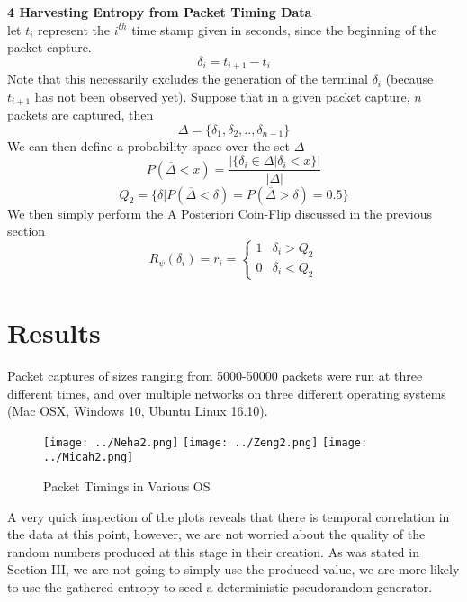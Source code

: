 \documentclass{IEEEtran}
\newenvironment{definition}[1][Definition]{\begin{trivlist}
\item[\hskip \labelsep {\bfseries #1}]}{\end{trivlist}}
\begin{document}
\begin{definition}
\textbf{4 Harvesting Entropy from Packet Timing Data} \\
let $t_i$ represent the $i^{th}$ time stamp given in seconds, since the beginning of the packet capture. 
$$\delta_i = t_{i+1} - t_{i}$$
Note that this necessarily excludes the generation of the terminal $\delta_i$ (because $t_{i+1}$ has not been observed yet). Suppose that in a given packet capture, $n$ packets are captured, then
$$\Delta = \{\delta_1,\delta_2,..,\delta_{n-1}\}$$
We can then define a probability space over the set $\Delta$
$$P(\overline{\Delta} < x) =  \frac{\vert\{\delta_i \in \Delta| \delta_i < x\}\vert}{\vert \Delta \vert}$$
$$Q_2 = \{\delta \vert P(\overline{\Delta} < \delta) = P(\overline{\Delta} > \delta) = 0.5\}$$
We then simply perform the A Posteriori Coin-Flip discussed in the previous section
$$R_\psi(\delta_i) =  r_i = \begin{cases} 
      1 & \delta_i > Q_2 \\
      0 & \delta_i < Q_2
   \end{cases}$$

\end{definition}

\section{Results} 

Packet captures of sizes ranging from 5000-50000 packets were run at three different times, and over multiple networks on three different operating systems (Mac OSX, Windows 10, Ubuntu Linux 16.10). 

\begin{figure}[H]
\caption{Packet Timings in Various OS}
\begin{center}
\texttt{[image: ../Neha2.png]}
\texttt{[image: ../Zeng2.png]}
\texttt{[image: ../Micah2.png]}
\end{center}

\end{figure}

A very quick inspection of the plots reveals that there is  temporal correlation in the data at this point, however, we are not worried about the quality of the random numbers produced at this stage in their creation. As was stated in Section III, we are not going to simply use the produced value, we are more likely to use the gathered entropy to seed a deterministic pseudorandom generator. 
\end{document}
